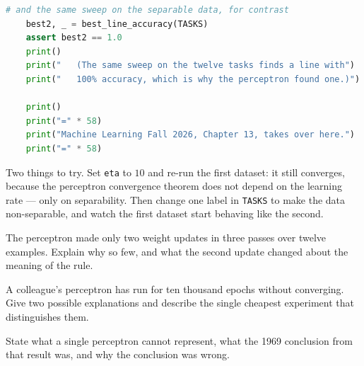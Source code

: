 \begin{lab}
\begin{lstlisting}[language=Python]
    # and the same sweep on the separable data, for contrast
    best2, _ = best_line_accuracy(TASKS)
    assert best2 == 1.0
    print()
    print("   (The same sweep on the twelve tasks finds a line with")
    print("   100% accuracy, which is why the perceptron found one.)")

    print()
    print("=" * 58)
    print("Machine Learning Fall 2026, Chapter 13, takes over here.")
    print("=" * 58)
\end{lstlisting}
Two things to try. Set \texttt{eta} to $10$ and re-run the first dataset: it still
converges, because the perceptron convergence theorem does not depend on the
learning rate --- only on separability. Then change one label in \texttt{TASKS} to
make the data non-separable, and watch the first dataset start behaving like the
second.
\end{lab}

\begin{checkpoint}
\begin{tightnum}
  \item The perceptron made only two weight updates in three passes over twelve
        examples. Explain why so few, and what the second update changed about the
        meaning of the rule.
  \item A colleague's perceptron has run for ten thousand epochs without
        converging. Give two possible explanations and describe the single cheapest
        experiment that distinguishes them.
  \item State what a single perceptron cannot represent, what the 1969 conclusion
        from that result was, and why the conclusion was wrong.
\end{tightnum}
\end{checkpoint}

